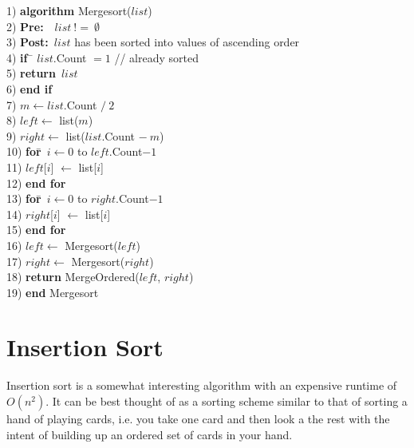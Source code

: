 \documentclass[10pt,oneside,a4paper]{report}
\begin{document}
\begin{tabbing}
1)  \textbf{alg}\= \textbf{orithm} Mergesort($list$) \\
2)  \> \textbf{Pre:}~~$list~!=~\emptyset$ \\
3)  \> \textbf{Post:}~$list$ has been sorted into values of ascending order \\
4)  \> \textbf{if}~\= $list$.Count $= 1$ // already sorted \\
5)  \> \> \textbf{return}~$list$ \\
6)  \> \textbf{end if} \\
7)  \> $m \leftarrow list$.Count $/~2$ \\
8)  \> $left \leftarrow$ list($m$) \\
9)  \> $right \leftarrow$ list($list$.Count $-~m$) \\
10) \> \textbf{for}\=~$i \leftarrow 0$ to $left$.Count$-1$ \\
11) \> \> $left$[$i$] $\leftarrow$ list[$i$] \\
12) \> \textbf{end for} \\
13) \> \textbf{for}\=~$i \leftarrow 0$ to $right$.Count$-1$ \\
14) \> \> $right$[$i$] $\leftarrow$ list[$i$] \\
15) \> \textbf{end for} \\
16) \> $left \leftarrow$ Mergesort($left$) \\
17) \> $right \leftarrow$ Mergesort($right$) \\
18) \> \textbf{return} MergeOrdered($left$, $right$) \\
19) \textbf{end} Mergesort \\
\end{tabbing}

\section{Insertion Sort}
Insertion sort is a somewhat interesting algorithm with an expensive runtime of $O(n^{2})$. It can be best thought of as a sorting scheme similar to that of sorting a hand of playing cards, i.e. you take one card and then look a the rest with the intent of building up an ordered set of cards in your hand.
\end{document}
